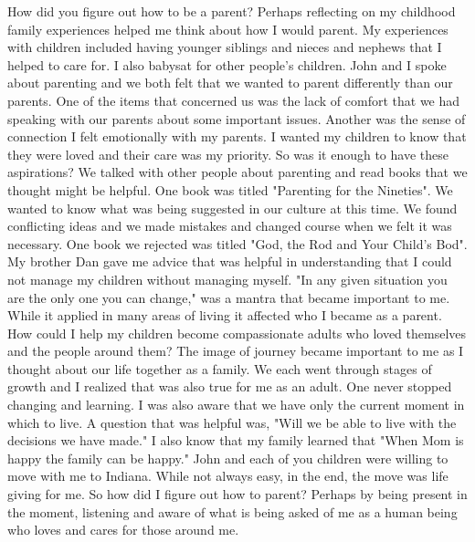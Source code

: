 How did you figure out how to be a parent?
Perhaps reflecting on my childhood family experiences helped me think about how I would parent. My experiences with children included having younger siblings and nieces and nephews that I helped to care for. I also babysat for other people's children. John and I spoke about parenting and we both felt that we wanted to parent differently than our parents. One of the items that concerned us was the lack of comfort that we had speaking with our parents about some important issues. Another was the sense of connection I felt emotionally with my parents. I wanted my children to know that they were loved and their care was my priority.
So was it enough to have these aspirations? We talked with other people about parenting and read books that we thought might be helpful. One book was titled "Parenting for the Nineties". We wanted to know what was being suggested in our culture at this time. We found conflicting ideas and we made mistakes and changed course when we felt it was necessary. One book we rejected was titled "God, the Rod and Your Child's Bod".
My brother Dan gave me advice that was helpful in understanding that I could not manage my children without managing myself. "In any given situation you are the only one you can change," was a mantra that became important to me. While it applied in many areas of living it affected who I became as a parent. How could I help my children become compassionate adults who loved themselves and the people around them?
The image of journey became important to me as I thought about our life together as a family. We each went through stages of growth and I realized that was also true for me as an adult. One never stopped changing and learning. I was also aware that we have only the current moment in which to live. A question that was helpful was, "Will we be able to live with the decisions we have made." I also know that my family learned that "When Mom is happy the family can be happy." John and each of you children were willing to move with me to Indiana. While not always easy, in the end, the move was life giving for me.
So how did I figure out how to parent? Perhaps by being present in the moment, listening and aware of what is being asked of me as a human being who loves and cares for those around me.




